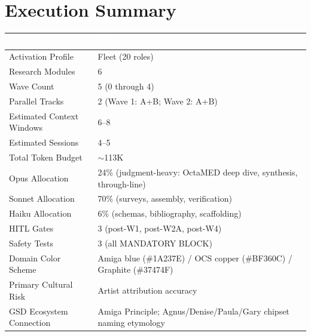 \documentclass[11pt,letterpaper]{article}
\newcommand{\tableheader}[1]{\textbf{\sffamily\textcolor{white}{#1}}}
\begin{document}
\section{Execution Summary}

\begin{center}
\begin{tabularx}{\textwidth}{L{5cm}X}
\toprule
{}
\tableheader{Metric} & \tableheader{Value} \\
\midrule
Activation Profile & Fleet (20 roles) \\
Research Modules & 6 \\
Wave Count & 5 (0 through 4) \\
Parallel Tracks & 2 (Wave 1: A+B; Wave 2: A+B) \\
Estimated Context Windows & 6--8 \\
Estimated Sessions & 4--5 \\
Total Token Budget & $\sim$113K \\
Opus Allocation & 24\% (judgment-heavy: OctaMED deep dive, synthesis, through-line) \\
Sonnet Allocation & 70\% (surveys, assembly, verification) \\
Haiku Allocation & 6\% (schemas, bibliography, scaffolding) \\
HITL Gates & 3 (post-W1, post-W2A, post-W4) \\
Safety Tests & 3 (all MANDATORY BLOCK) \\
Domain Color Scheme & Amiga blue (\#1A237E) / OCS copper (\#BF360C) / Graphite (\#37474F) \\
Primary Cultural Risk & Artist attribution accuracy \\
GSD Ecosystem Connection & Amiga Principle; Agnus/Denise/Paula/Gary chipset naming etymology \\
\bottomrule
\end{tabularx}
\end{center}

\vspace{2em}
\end{document}
